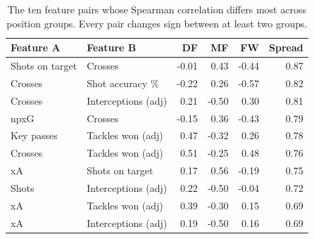 \begin{table}[t]
\centering
\small
\caption{The ten feature pairs whose Spearman correlation differs most across position groups. Every pair changes sign between at least two groups.}
\label{tab:divergence}
\begin{tabular}{llrrrr}
\toprule
Feature A & Feature B & DF & MF & FW & Spread \\
\midrule
Shots on target & Crosses & -0.01 & 0.43 & -0.44 & 0.87 \\
Crosses & Shot accuracy \% & -0.22 & 0.26 & -0.57 & 0.82 \\
Crosses & Interceptions (adj) & 0.21 & -0.50 & 0.30 & 0.81 \\
npxG & Crosses & -0.15 & 0.36 & -0.43 & 0.79 \\
Key passes & Tackles won (adj) & 0.47 & -0.32 & 0.26 & 0.78 \\
Crosses & Tackles won (adj) & 0.51 & -0.25 & 0.48 & 0.76 \\
xA & Shots on target & 0.17 & 0.56 & -0.19 & 0.75 \\
Shots & Interceptions (adj) & 0.22 & -0.50 & -0.04 & 0.72 \\
xA & Tackles won (adj) & 0.39 & -0.30 & 0.15 & 0.69 \\
xA & Interceptions (adj) & 0.19 & -0.50 & 0.16 & 0.69 \\
\bottomrule
\end{tabular}
\end{table}
